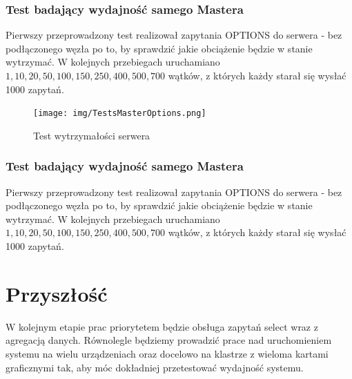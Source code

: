 \documentclass[paper=a4, fontsize=11pt]{scrartcl} %
\numberwithin{equation}{section} %
\numberwithin{figure}{section} %
\numberwithin{table}{section} %
\begin{document}
	\subsubsection{Test badający wydajność samego Mastera}
	Pierwszy przeprowadzony test realizował zapytania OPTIONS do serwera - bez podłączonego węzła po to, by sprawdzić jakie obciążenie będzie w stanie wytrzymać. W kolejnych przebiegach uruchamiano $1, 10,	20,	50,	100, 150, 250, 400, 500, 700$ wątków, z których każdy starał się wysłać 1000 zapytań. 
	\begin{figure}
	\centering
	\caption{Test wytrzymałości serwera}
		\texttt{[image: img/TestsMasterOptions.png]}
	\end{figure}
	
		\subsubsection{Test badający wydajność samego Mastera}
	Pierwszy przeprowadzony test realizował zapytania OPTIONS do serwera - bez podłączonego węzła po to, by sprawdzić jakie obciążenie będzie w stanie wytrzymać. W kolejnych przebiegach uruchamiano $1, 10,	20,	50,	100, 150, 250, 400, 500, 700$ wątków, z których każdy starał się wysłać 1000 zapytań. 
	
 

\section{Przyszłość}
W kolejnym etapie prac priorytetem będzie obsługa zapytań select wraz z agregacją danych. Równolegle będziemy prowadzić prace nad uruchomieniem systemu na wielu urządzeniach oraz docelowo na klastrze z wieloma kartami graficznymi tak, aby móc dokładniej przetestować wydajność systemu.
\end{document}
